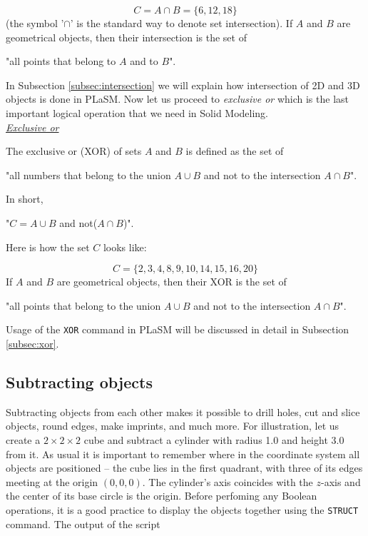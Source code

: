 $$
C = A \cap B = \{6, 12, 18\}
$$
(the symbol '$\cap$' is the standard way to denote set intersection). If $A$
and $B$ are geometrical objects, then their intersection is the set of \\

\centerline{
"all points that belong to $A$ {\color{red}and} to $B$".
}
\vspace{4mm}
\noindent
In Subsection \ref{subsec:intersection} we will explain how 
intersection of 2D and 3D objects is done in PLaSM. Now let us 
proceed to {\em exclusive or} which is the last important 
logical operation that we need in Solid Modeling.\\

\noindent
\underline{\em Exclusive or}

The exclusive or (XOR) of sets $A$ and $B$ is defined as the set of \\

\centerline{
"all numbers that belong to the union $A \cup B$ {\color{red}and not} to the intersection $A \cap B$".
}
\vspace{4mm}
\noindent
In short,\\

\centerline{
"$C = A \cup B$ {\color{red}and not}($A \cap B$)".
}
\vspace{4mm}
\noindent
Here is how the set $C$ looks like:

$$
C = \{2, 3, 4, 8, 9, 10, 14, 15, 16, 20\}
$$
If $A$ and $B$ are geometrical objects, then their XOR is the set of \\

\centerline{
"all points that belong to the union $A \cup B$ {\color{red}and not} to the intersection $A \cap B$".
}
\vspace{4mm}
\noindent
Usage of the {\tt XOR} command in PLaSM will be discussed in detail 
in Subsection \ref{subsec:xor}.


\subsection{Subtracting objects}\label{subsec:subtract}

Subtracting objects from each other makes it possible 
to drill holes, cut and slice objects, round edges, make 
imprints, and much more. 
For illustration, let us create a $2 \times 2 \times 2$ cube and subtract 
a cylinder with radius 1.0 and height 3.0 from it. As usual it is important to remember where 
in the coordinate system all objects are positioned -- the cube lies in the 
first quadrant, with three of its edges meeting at the origin $(0, 0, 0)$.
The cylinder's axis coincides with the $z$-axis and the center of its base
circle is the origin. Before perfoming any Boolean operations, it is a good 
practice to display the objects together using the {\tt STRUCT} command. The 
output of the script\\

